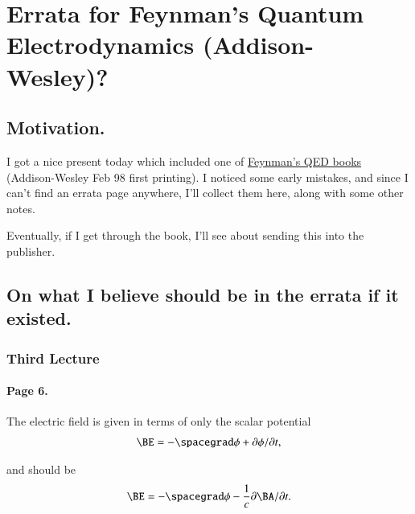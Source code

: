 %
%

\chapter{Errata for Feynman's Quantum Electrodynamics (Addison-Wesley)?}
\label{chap:feynmanQEDerrata}
{}
\date{May 28, 2010}

\beginArtWithToc

\section{Motivation.}

I got a nice present today which included one of \href{http://www.amazon.com/Quantum-Electrodynamics-Advanced-Book-Classics/dp/0201360756/ref=sr_1_1?ie=UTF8&s=books&qid=1275092228&sr=8-1}{Feynman's QED books} (Addison-Wesley Feb 98 first printing).  I noticed some early mistakes, and since I can't find an errata page anywhere, I'll collect them here, along with some other notes.

Eventually, if I get through the book, I'll see about sending this into the publisher.

\section{On what I believe should be in the errata if it existed.}
\subsection{Third Lecture}
\subsubsection{Page 6.}

The electric field is given in terms of only the scalar potential
\begin{align*}
\BE = -\spacegrad \phi + \partial \phi/ \partial t,
\end{align*}

and should be
\begin{align*}
\BE = -\spacegrad \phi - \inv{c} \partial \BA/ \partial t.
\end{align*}

